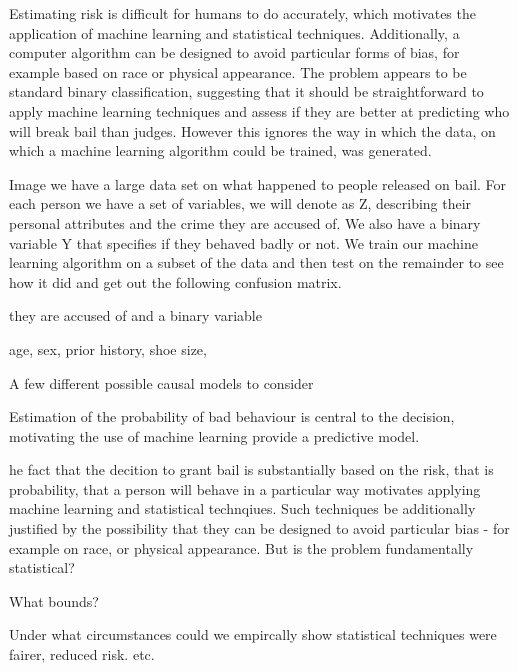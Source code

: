 \documentclass[11pt,a4paper]{article}
\begin{document}
Estimating risk is difficult for humans to do accurately, which motivates the application of machine learning and statistical techniques. Additionally, a computer algorithm can be designed to avoid particular forms of bias, for example based on race or physical appearance. The problem appears to be standard binary classification, suggesting that it should be straightforward to apply machine learning techniques and assess if they are better at predicting who will break bail than judges. However this ignores the way in which the data, on which a machine learning algorithm could be trained, was generated. 

Image we have a large data set on what happened to people released on bail. For each person we have a set of variables, we will denote as Z, describing their personal attributes and the crime they are accused of. We also have a binary variable Y that specifies if they behaved badly or not. We train our machine learning algorithm on a subset of the data and then test on the remainder to see how it did and get out the following confusion matrix. 



they are accused of and a binary variable 

 age, sex, prior history, shoe size, 












A few different possible causal models to consider 

Estimation of the probability of bad behaviour is central to the decision, motivating the use of machine learning provide a predictive model.  

he fact that the decition to grant bail is substantially based on the risk, that is probability, that a person will behave in a particular way motivates applying machine learning and statistical technqiues. Such techniques be additionally justified by the possibility that they can be designed to avoid particular bias - for example on race, or physical appearance. But is the problem fundamentally statistical?

What bounds?

Under what circumstances could we empircally show statistical techniques were fairer, reduced risk. etc. 
\end{document}
